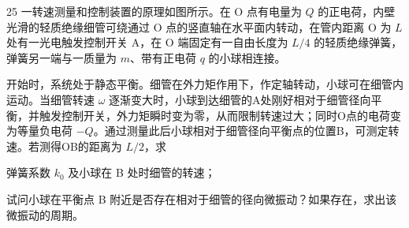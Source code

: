 \begin{problem}[理论考试][转速测量与控制装置]{25}
  一转速测量和控制装置的原理如图所示。在 O 点有电量为 $Q$ 的正电荷，内壁光滑的轻质绝缘细管可绕通过 O 点的竖直轴在水平面内转动，在管内距离 O 为 $L$ 处有一光电触发控制开关 A，在 O 端固定有一自由长度为 $L/4$ 的轻质绝缘弹簧，弹簧另一端与一质量为 $m$、带有正电荷 $q$ 的小球相连接。

  开始时，系统处于静态平衡。细管在外力矩作用下，作定轴转动，小球可在细管内运动。当细管转速 $\omega$ 逐渐变大时，小球到达细管的A处刚好相对于细管径向平衡，并触发控制开关，外力矩瞬时变为零，从而限制转速过大；同时O点的电荷变为等量负电荷 $-Q$。通过测量此后小球相对于细管径向平衡点的位置B，可测定转速。若测得OB的距离为 $L/2$，求
  \begin{subproblem}
    弹簧系数 $k_{0}$ 及小球在 B 处时细管的转速；
  \end{subproblem}
  \begin{subproblem}
    试问小球在平衡点 B 附近是否存在相对于细管的径向微振动？如果存在，求出该微振动的周期。
  \end{subproblem}
\end{problem}